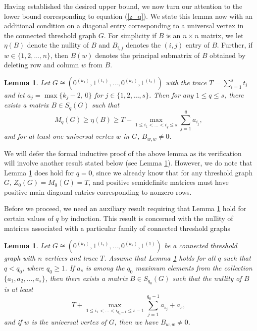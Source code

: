 \documentclass[3p,times,12pt]{article}
\newtheorem{lemma}[theorem]{Lemma}
\begin{document}
Having established the desired upper bound, we now turn our attention to the lower bound corresponding to equation (\ref{z_q}). We state this lemma now with an additional condition on a diagonal entry corresponding to a universal vertex in the connected threshold graph $G$. For simplicity if $B$ is an $n \times n$ matrix, we let $\eta(B)$ denote the nullity of $B$ and $B_{i,j}$ denotes the $(i,j)$ entry of $B$. Further, if $w \in \{1,2,\ldots, n\}$, then $B(w)$ denotes the principal submatrix of $B$ obtained by deleting row and column $w$ from $B$.



\begin{lemma}\label{thm:lowerbound on z_q}
 Let $G\cong (0^{(k_1)}, 1^{(t_1)}, \ldots,0^{(k_s)}, 1^{(t_s)})$ with the trace $T=\sum_{i=1}^s t_i$ and let $a_j=\max\{k_j-2,\,0\}$ for $j\in \{1,2,\ldots,s\}$. Then for any $1 \leq q \leq s$, there exists a matrix $B \in S_q(G)$ such that 
 \begin{equation}\label{lower on z_q}
M_q(G) \geq \eta(B) \geq  T+\max_{1 \le i_1<\ldots<i_q \le s} \sum_{j=1}^q a_{i_j},
 \end{equation}
 and for at least one universal vertex $w$ in $G$, $B_{w,w}\neq 0$.
\end{lemma}

We will defer the formal inductive proof of the above lemma as its verification will involve another result stated below (see Lemma \ref{ts=1}). However, we do note that Lemma \ref{thm:lowerbound on z_q} does hold for $q=0$, since we already know that  for any threshold graph $G$, $Z_0(G)=M_0(G)=T$, and positive semidefinite matrices must have positive main diagonal entries corresponding to nonzero rows.

Before we proceed, we need an auxiliary result requiring that Lemma \ref{thm:lowerbound on z_q} hold for certain values of $q$ by induction. This result is  concerned with the nullity of matrices associated with a particular family of connected threshold graphs 

\begin{lemma}
Let $G\cong (0^{(k_1)}, 1^{(t_1)}, \ldots,0^{(k_s)},1^{(1)})$ be a connected threshold graph with $n$ vertices and trace $T$. Assume that Lemma \ref{thm:lowerbound on z_q} holds for all $q$ such that $q<q_0$, where $q_0\geq 1$. If $a_s$ is among the $q_0$ maximum elements from the collection $\{a_1, a_2, \ldots, a_s\}$, then there exists a matrix $B \in S_{q_0}(G)$ such that the nullity of $B$ is at least 
\[T+\max_{1 \le i_1<\ldots<i_{q_{0}-1} \le s-1} \sum_{j=1}^{q_{0}-1} a_{i_j} + a_s,\] and if $w$ is the universal vertex of $G$, then we have $B_{w,w}\neq 0$.
 \label{ts=1}
 \end{lemma}
 
\end{document}
